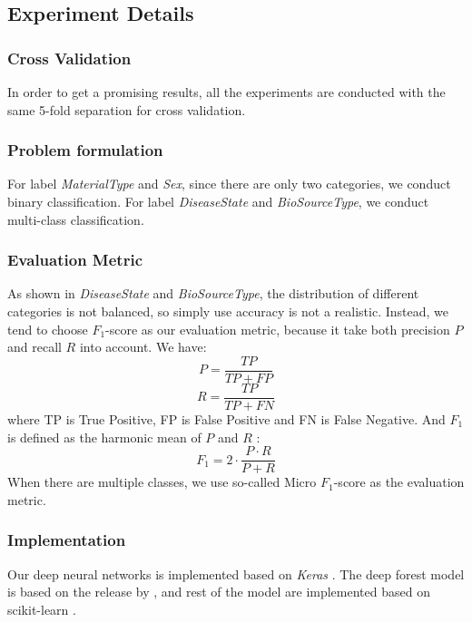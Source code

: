 \documentclass[sigconf]{acmart}
\begin{document}
	\subsection{Experiment Details}
	\subsubsection{Cross Validation}
	In order to get a promising results, all the experiments are conducted with the same 5-fold separation for cross validation.  
	
	\subsubsection{Problem formulation}
	For label \textit{MaterialType} and \textit{Sex}, since there are only two categories, we conduct binary classification. For label \textit{DiseaseState} and \textit{BioSourceType}, we conduct multi-class classification.
	
	\subsubsection{Evaluation Metric}
	As shown in \textit{DiseaseState} and \textit{BioSourceType}, the distribution of different categories is not balanced, so simply use accuracy is not a realistic. Instead, we tend to choose $F_1$-score as our evaluation metric, because it take both precision $P$ and recall $R$ into account. We have:
	\begin{equation}
	P=\frac{TP}{TP+FP} \nonumber
	\end{equation}
	\begin{equation}
	R=\frac{TP}{TP+FN} \nonumber
	\end{equation}
	where TP is True Positive, FP is False Positive and FN is False Negative. And $F_1$ is defined as the harmonic mean of $P$ and
	$R$ : 
	\begin{equation}
	F_1=2\cdot\frac{P\cdot R}{P+R} \nonumber
	\end{equation}
	When there are multiple classes, we use so-called Micro $F_1$-score as the evaluation metric.
	
	\subsubsection{Implementation}
	Our deep neural networks is implemented based on \textit{Keras} \cite{chollet2015keras}. The deep forest model is based on the release by \citet{zhou2017deep}, and rest of the model are implemented based on scikit-learn \cite{scikit-learn}.
	
\end{document}
